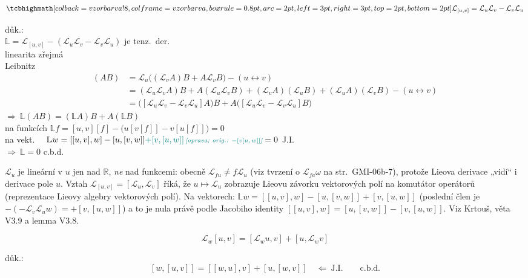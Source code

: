 \begin{veta}[Tvrzení]
\[
  \vzorec{\mathcal{L}_{[u,v]} = \mathcal{L}_u\mathcal{L}_v - \mathcal{L}_v\mathcal{L}_u}
\]
\end{veta}
důk.: \\
\quad $\mathbb{L} = \mathcal{L}_{[u,v]} - (\mathcal{L}_u\mathcal{L}_v - \mathcal{L}_v\mathcal{L}_u)$ \quad je tenz.\ der. \\
\quad linearita zřejmá \\
\quad Leibnitz
\begin{align*}
  [\mathcal{L}_u\mathcal{L}_v - \mathcal{L}_v\mathcal{L}_u](AB)
  &= \mathcal{L}_u\big((\mathcal{L}_vA)B + A\mathcal{L}_vB\big) - (u\leftrightarrow v) \\
  &= (\mathcal{L}_u\mathcal{L}_vA)B + A(\mathcal{L}_u\mathcal{L}_vB) + (\mathcal{L}_vA)(\mathcal{L}_uB) + (\mathcal{L}_uA)(\mathcal{L}_vB) - (u\leftrightarrow v) \\
  &= \big([\mathcal{L}_u\mathcal{L}_v - \mathcal{L}_v\mathcal{L}_u]A\big)B + A\big([\mathcal{L}_u\mathcal{L}_v - \mathcal{L}_v\mathcal{L}_u]B\big)
\end{align*}
\quad $\Rightarrow\ \mathbb{L}(AB) = (\mathbb{L}A)B + A(\mathbb{L}B)$ \\
\quad na funkcích \quad $\mathbb{L}f = [u,v][f] - \big(u[v[f]] - v[u[f]]\big) = 0$ \\
\quad na vekt. \quad\ \ $\mathbb{L}w = [[u,v],w] - [u,[v,w]] \oprava{+[v,[u,w]]}{-[v[u,w]]} = 0$ \quad J.I. \\
\quad $\Rightarrow\ \mathbb{L} = 0$ \quad c.b.d.

\begin{vysvetleni}
$\mathcal{L}_u$ je lineární v $u$ jen nad $\mathbb{R}$, \emph{ne} nad funkcemi: obecně $\mathcal{L}_{fu}\neq f\mathcal{L}_u$ (viz tvrzení o $\mathcal{L}_{fa}\omega$ na str.~GMI-06b-7), protože Lieova derivace „vidí“ i derivace pole $u$.
Vztah $\mathcal{L}_{[u,v]}=[\mathcal{L}_u,\mathcal{L}_v]$ říká, že $u\mapsto\mathcal{L}_u$ zobrazuje Lieovu závorku vektorových polí na komutátor operátorů (reprezentace Lieovy algebry vektorových polí).
Na vektorech: $\mathbb{L}w=[[u,v],w]-[u,[v,w]]+[v,[u,w]]$ (poslední člen je $-(-\mathcal{L}_v\mathcal{L}_uw)=+[v,[u,w]]$) a to je nula právě podle Jacobiho identity $[[u,v],w]=[u,[v,w]]-[v,[u,w]]$. Viz Krtouš, věta V3.9 a lemma V3.8.
\end{vysvetleni}

\begin{veta}[Tvrzení]
\[
  \mathcal{L}_w[u,v] = [\mathcal{L}_wu,v] + [u,\mathcal{L}_wv]
\]
\end{veta}
důk.:
\[
  [w,[u,v]] = [[w,u],v] + [u,[w,v]] \quad\Leftarrow\ \text{J.I.} \qquad\text{c.b.d.}
\]

